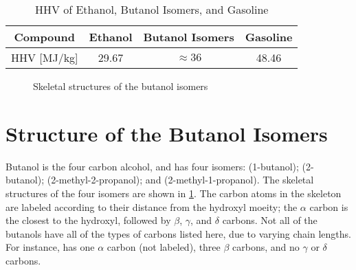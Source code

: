 \documentclass[../main.tex]{subfiles}
\begin{document}
\begin{table}[!ht]
    \caption{HHV of Ethanol, Butanol Isomers, and Gasoline}
    \label{tab:buoh-heats}
    \begin{tabular}{*{4}{c}}
        \toprule
        Compound & Ethanol \cite{Afeefy2014} & Butanol Isomers \cite{Afeefy2014} & Gasoline \cite{Davis2013} \\
        \midrule
        HHV [\si[per-mode = symbol]{\mega\joule\per\kilo\gram}] & 29.67 & $\approx 36$ & 48.46 \\
        \bottomrule
    \end{tabular}
\end{table}

\begin{figure}[!ht]
    {\caption{Skeletal structures of the butanol isomers}
    \label{fig:buoh-isomers}}
\end{figure}

\section{Structure of the Butanol Isomers}
\label{sec:butanol-isomers}

Butanol is the four carbon alcohol, and has four isomers:
\nBuOH{} (1-butanol);
\sBuOH{} (2-butanol);
\tBuOH{} (2-methyl-2-propanol); and
\iBuOH{} (2-methyl-1-propanol).
The skeletal structures of the four isomers are shown in
\cref{fig:buoh-isomers}. The carbon atoms in the skeleton are
labeled according to their distance from the hydroxyl moeity; the
$\alpha$ carbon is the closest to the hydroxyl, followed by $\beta$,
$\gamma$, and $\delta$ carbons. Not all of the butanols have all of
the types of carbons listed here, due to varying chain lengths. For
instance, \tBuOH{} has one $\alpha$ carbon (not labeled), three $\beta$
carbons, and no $\gamma$ or $\delta$ carbons.
\end{document}

